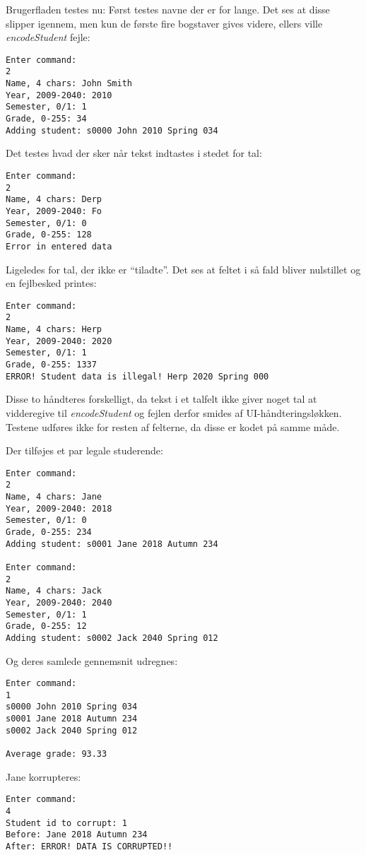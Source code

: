 Brugerfladen testes nu:
Først testes navne der er for lange. Det ses at disse slipper igennem, men kun
de første fire bogstaver gives videre, ellers ville \emph{encodeStudent} fejle:
\begin{lstlisting}[caption=Test af for lange navne]
Enter command: 
2
Name, 4 chars: John Smith
Year, 2009-2040: 2010
Semester, 0/1: 1
Grade, 0-255: 34
Adding student: s0000 John 2010 Spring 034
\end{lstlisting}

Det testes hvad der sker når tekst indtastes i stedet for tal:
\begin{lstlisting}[caption=Test af tekst i talfelt]
Enter command: 
2
Name, 4 chars: Derp
Year, 2009-2040: Fo
Semester, 0/1: 0
Grade, 0-255: 128
Error in entered data
\end{lstlisting}
Ligeledes for tal, der ikke er ``tiladte''. Det ses at feltet i så fald bliver
nulstillet og en fejlbesked printes:
\begin{lstlisting}[caption=Test af forkerte tal i talfelt]
Enter command: 
2
Name, 4 chars: Herp
Year, 2009-2040: 2020
Semester, 0/1: 1
Grade, 0-255: 1337
ERROR! Student data is illegal! Herp 2020 Spring 000
\end{lstlisting}
Disse to håndteres forskelligt, da tekst i et talfelt ikke giver noget tal at
vidderegive til \emph{encodeStudent} og fejlen derfor smides af
UI-håndteringsløkken. Testene udføres ikke for resten af felterne, da disse er
kodet på samme måde.

Der tilføjes et par legale studerende:
\begin{lstlisting}[caption=Legale studerende]
Enter command: 
2
Name, 4 chars: Jane
Year, 2009-2040: 2018
Semester, 0/1: 0
Grade, 0-255: 234
Adding student: s0001 Jane 2018 Autumn 234

Enter command: 
2
Name, 4 chars: Jack
Year, 2009-2040: 2040
Semester, 0/1: 1
Grade, 0-255: 12
Adding student: s0002 Jack 2040 Spring 012
\end{lstlisting}

Og deres samlede gennemsnit udregnes:
\begin{lstlisting}[caption=Print af database]
Enter command: 
1
s0000 John 2010 Spring 034
s0001 Jane 2018 Autumn 234
s0002 Jack 2040 Spring 012

Average grade: 93.33
\end{lstlisting}

Jane korrupteres:
\begin{lstlisting}[caption=Korruptering af Jane]
Enter command: 
4
Student id to corrupt: 1
Before: Jane 2018 Autumn 234
After: ERROR! DATA IS CORRUPTED!!
\end{lstlisting}

